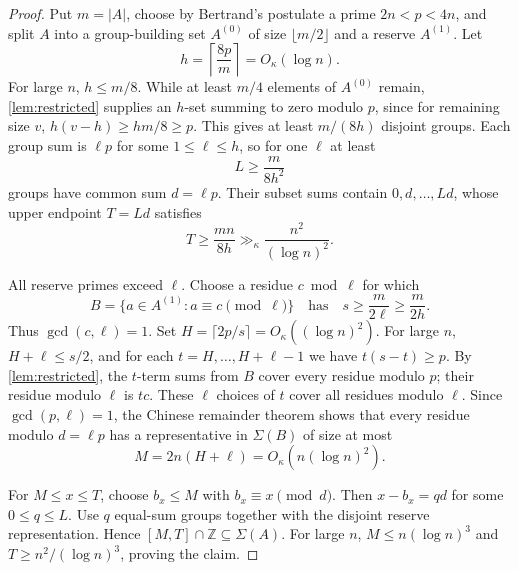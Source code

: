 \documentclass[11pt,a4paper]{article}
\theoremstyle{plain}
\theoremstyle{definition}
\theoremstyle{remark}
\begin{document}
\label{pf:prime}
\lemprime*
\begin{proof}
Put $m=|A|$, choose by Bertrand's postulate a prime $2n<p<4n$, and
split $A$ into a group-building set $A^{(0)}$ of size $\lfloor m/2\rfloor$
and a reserve $A^{(1)}$. Let
\[
 h=\left\lceil\frac{8p}{m}\right\rceil=O_\kappa(\log n).
\]
For large $n$, $h\le m/8$. While at least $m/4$ elements of $A^{(0)}$
remain, \cref{lem:restricted} supplies an $h$-set summing to zero modulo
$p$, since for remaining size $v$,
$h(v-h)\ge hm/8\ge p$. This gives at least $m/(8h)$ disjoint groups.
Each group sum is $\ell p$ for some $1\le\ell\le h$, so for one $\ell$
at least
\[
 L\ge\frac{m}{8h^2}
\]
groups have common sum $d=\ell p$. Their subset sums contain
$0,d,\ldots,Ld$, whose upper endpoint $T=Ld$ satisfies
\[
 T\ge\frac{mn}{8h}\gg_\kappa\frac{n^2}{(\log n)^2}.
\]

All reserve primes exceed $\ell$. Choose a residue $c\bmod\ell$ for
which
\[
 B=\{a\in A^{(1)}:a\equiv c\pmod\ell\}
\quad\text{has}\quad
 s\ge\frac{m}{2\ell}\ge\frac{m}{2h}.
\]
Thus $\gcd(c,\ell)=1$. Set
$H=\lceil2p/s\rceil=O_\kappa((\log n)^2)$. For large $n$,
$H+\ell\le s/2$, and for each
$t=H,\ldots,H+\ell-1$ we have $t(s-t)\ge p$. By
\cref{lem:restricted}, the $t$-term sums from $B$ cover every residue
modulo $p$; their residue modulo $\ell$ is $tc$. These $\ell$ choices of
$t$ cover all residues modulo $\ell$. Since $\gcd(p,\ell)=1$, the Chinese
remainder theorem shows that every residue modulo $d=\ell p$ has a
representative in $\Sigma(B)$ of size at most
\[
 M=2n(H+\ell)=O_\kappa(n(\log n)^2).
\]

For $M\le x\le T$, choose $b_x\le M$ with $b_x\equiv x\pmod d$. Then
$x-b_x=qd$ for some $0\le q\le L$. Use $q$ equal-sum groups together
with the disjoint reserve representation. Hence
$[M,T]\cap\mathbb Z\subseteq\Sigma(A)$. For large $n$,
$M\le n(\log n)^3$ and $T\ge n^2/(\log n)^3$, proving the claim.
\end{proof}
\end{document}
